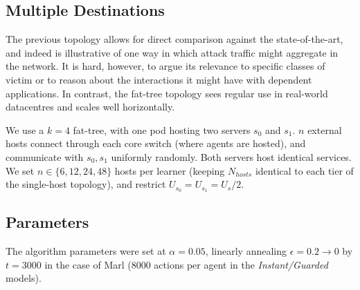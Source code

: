 \documentclass[10pt, times, conference, letterpaper]{IEEEtran}
\begin{document}
\subsection{Multiple Destinations}
The previous topology allows for direct comparison against the state-of-the-art, and indeed is illustrative of one way in which attack traffic might aggregate in the network.
It is hard, however, to argue its relevance to specific classes of victim or to reason about the interactions it might have with dependent applications.
In contrast, the fat-tree topology \cite{DBLP:conf/sigcomm/Al-FaresLV08} sees regular use in real-world datacentres and scales well horizontally.

We use a $k=4$ fat-tree, with one pod hosting two servers $s_0$ and $s_1$.
$n$ external hosts connect through each core switch (where agents are hosted), and communicate with $s_0, s_1$ uniformly randomly.
Both servers host identical services.
We set $n \in \{6, 12, 24, 48\}$ hosts per learner (keeping $N_{\mathit{hosts}}$ identical to each tier of the single-host topology), and restrict $U_{s_0} = U_{s_1} = U_s / 2$.

\subsection{Parameters}
The algorithm parameters were set at $\alpha=0.05$, linearly annealing $\epsilon=0.2 \rightarrow 0$ by $t=3000$ in the case of Marl (\num{8000} actions per agent in the \emph{Instant/Guarded} models).
\end{document}
